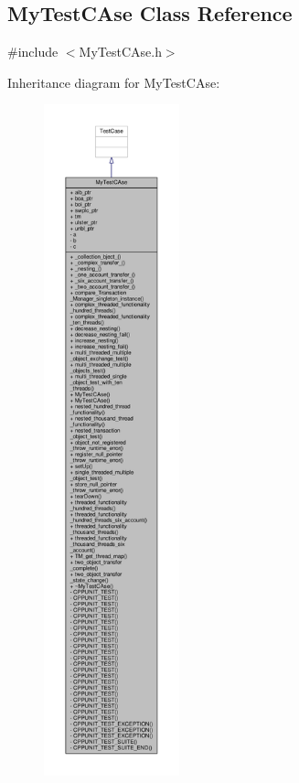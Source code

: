 \hypertarget{class_my_test_c_ase}{}\subsection{My\+Test\+C\+Ase Class Reference}
\label{class_my_test_c_ase}


{\ttfamily \#include $<$My\+Test\+C\+Ase.\+h$>$}



Inheritance diagram for My\+Test\+C\+Ase\+:
\nopagebreak
\begin{figure}[H]
\begin{center}
\leavevmode
\includegraphics[height=550pt]{class_my_test_c_ase__inherit__graph}
\end{center}
\end{figure}


